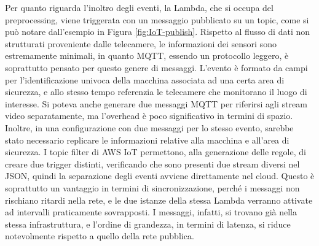 
Per quanto riguarda l'inoltro degli eventi, la Lambda, che si occupa del preprocessing, viene triggerata con un messaggio pubblicato su un topic, come si può notare dall'esempio in Figura \ref{fig:IoT-publish}. Rispetto al flusso di dati non strutturati proveniente dalle telecamere, le informazioni dei sensori sono estremamente minimali, in quanto MQTT, essendo un protocollo leggero, è soprattutto pensato per questo genere di messaggi. L'evento è formato da campi per l'identificazione univoca della macchina associata ad una certa area di sicurezza, e allo stesso tempo referenzia le telecamere che monitorano il luogo di interesse. Si poteva anche generare due messaggi MQTT per riferirsi agli stream video separatamente, ma l'overhead è poco significativo in termini di spazio. Inoltre, in una configurazione con due messaggi per lo stesso evento, sarebbe stato necessario replicare le informazioni relative alla macchina e all'area di sicurezza. I topic filter di AWS IoT permettono, alla generazione delle regole, di creare due trigger distinti, verificando che sono presenti due stream diversi nel JSON, quindi la separazione degli eventi avviene direttamente nel cloud. Questo è soprattutto un vantaggio in termini di sincronizzazione, perché i messaggi non rischiano ritardi nella rete, e le due istanze della stessa Lambda verranno attivate ad intervalli praticamente sovrapposti. I messaggi, infatti, si trovano già nella stessa infrastruttura, e l'ordine di grandezza, in termini di latenza, si riduce notevolmente rispetto a quello della rete pubblica. %
